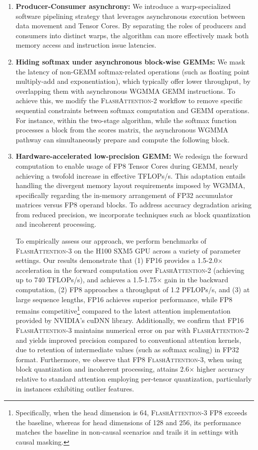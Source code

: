 \begin{enumerate}

\item \textbf{Producer-Consumer asynchrony:} We introduce a warp-specialized software pipelining strategy that leverages asynchronous execution between data movement and Tensor Cores. By separating the roles of producers and consumers into distinct warps, the algorithm can more effectively mask both memory access and instruction issue latencies.
\item \textbf{Hiding softmax under asynchronous block-wise GEMMs:} We mask the latency of non-GEMM softmax-related operations (such as floating point multiply-add and exponentiation), which typically offer lower throughput, by overlapping them with asynchronous WGMMA GEMM instructions. To achieve this, we modify the \textsc{FlashAttention-2} workflow to remove specific sequential constraints between softmax computation and GEMM operations. For instance, within the two-stage algorithm, while the softmax function processes a block from the scores matrix, the asynchronous WGMMA pathway can simultaneously prepare and compute the following block.
\item \textbf{Hardware-accelerated low-precision GEMM:} We redesign the forward computation to enable usage of FP8 Tensor Cores during GEMM, nearly achieving a twofold increase in effective TFLOPs/s. This adaptation entails handling the divergent memory layout requirements imposed by WGMMA, specifically regarding the in-memory arrangement of FP32 accumulator matrices versus FP8 operand blocks. To address accuracy degradation arising from reduced precision, we incorporate techniques such as block quantization and incoherent processing.

To empirically assess our approach, we perform benchmarks of \textsc{FlashAttention-3} on the H100 SXM5 GPU across a variety of parameter settings. Our results demonstrate that (1) FP16 provides a 1.5-2.0$\times$ acceleration in the forward computation over \textsc{FlashAttention-2} (achieving up to 740 TFLOPs/s), and achieves a 1.5-1.75$\times$ gain in the backward computation, (2) FP8 approaches a throughput of 1.2 PFLOPs/s, and (3) at large sequence lengths, FP16 achieves superior performance, while FP8 remains competitive\footnote{Specifically, when the head dimension is 64, \textsc{FlashAttention-3} FP8 exceeds the baseline, whereas for head dimensions of 128 and 256, its performance matches the baseline in non-causal scenarios and trails it in settings with causal masking.} compared to the latest attention implementation provided by NVIDIA’s cuDNN library. Additionally, we confirm that FP16 \textsc{FlashAttention-3} maintains numerical error on par with \textsc{FlashAttention-2} and yields improved precision compared to conventional attention kernels, due to retention of intermediate values (such as softmax scaling) in FP32 format. Furthermore, we observe that FP8 \textsc{FlashAttention-3}, when using block quantization and incoherent processing, attains 2.6$\times$ higher accuracy relative to standard attention employing per-tensor quantization, particularly in instances exhibiting outlier features.


\end{enumerate}
